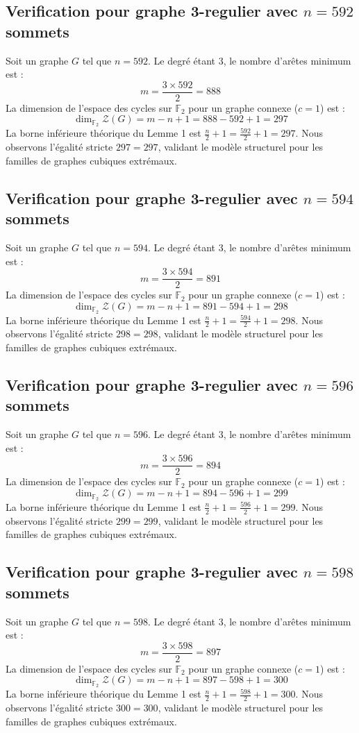 \documentclass[11pt,a4paper]{article}
\begin{document}
\subsection{Verification pour graphe 3-regulier avec $n=592$ sommets}
Soit un graphe $G$ tel que $n = 592$. Le degré étant 3, le nombre d'arêtes minimum est :
$$ m = \frac{3 \times 592}{2} = 888 $$
La dimension de l'espace des cycles sur $\mathbb{F}_2$ pour un graphe connexe ($c=1$) est :
$$ \dim_{\mathbb{F}_2} \mathcal{Z}(G) = m - n + 1 = 888 - 592 + 1 = 297 $$
La borne inférieure théorique du Lemme 1 est $\frac{n}{2} + 1 = \frac{592}{2} + 1 = 297$.
Nous observons l'égalité stricte $297 = 297$, validant le modèle structurel pour les familles de graphes cubiques extrémaux.

\subsection{Verification pour graphe 3-regulier avec $n=594$ sommets}
Soit un graphe $G$ tel que $n = 594$. Le degré étant 3, le nombre d'arêtes minimum est :
$$ m = \frac{3 \times 594}{2} = 891 $$
La dimension de l'espace des cycles sur $\mathbb{F}_2$ pour un graphe connexe ($c=1$) est :
$$ \dim_{\mathbb{F}_2} \mathcal{Z}(G) = m - n + 1 = 891 - 594 + 1 = 298 $$
La borne inférieure théorique du Lemme 1 est $\frac{n}{2} + 1 = \frac{594}{2} + 1 = 298$.
Nous observons l'égalité stricte $298 = 298$, validant le modèle structurel pour les familles de graphes cubiques extrémaux.

\subsection{Verification pour graphe 3-regulier avec $n=596$ sommets}
Soit un graphe $G$ tel que $n = 596$. Le degré étant 3, le nombre d'arêtes minimum est :
$$ m = \frac{3 \times 596}{2} = 894 $$
La dimension de l'espace des cycles sur $\mathbb{F}_2$ pour un graphe connexe ($c=1$) est :
$$ \dim_{\mathbb{F}_2} \mathcal{Z}(G) = m - n + 1 = 894 - 596 + 1 = 299 $$
La borne inférieure théorique du Lemme 1 est $\frac{n}{2} + 1 = \frac{596}{2} + 1 = 299$.
Nous observons l'égalité stricte $299 = 299$, validant le modèle structurel pour les familles de graphes cubiques extrémaux.

\subsection{Verification pour graphe 3-regulier avec $n=598$ sommets}
Soit un graphe $G$ tel que $n = 598$. Le degré étant 3, le nombre d'arêtes minimum est :
$$ m = \frac{3 \times 598}{2} = 897 $$
La dimension de l'espace des cycles sur $\mathbb{F}_2$ pour un graphe connexe ($c=1$) est :
$$ \dim_{\mathbb{F}_2} \mathcal{Z}(G) = m - n + 1 = 897 - 598 + 1 = 300 $$
La borne inférieure théorique du Lemme 1 est $\frac{n}{2} + 1 = \frac{598}{2} + 1 = 300$.
Nous observons l'égalité stricte $300 = 300$, validant le modèle structurel pour les familles de graphes cubiques extrémaux.
\end{document}
